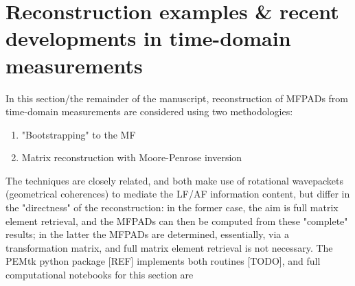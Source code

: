 \section{Reconstruction examples & recent developments in time-domain measurements}

In this section/the remainder of the manuscript, reconstruction of MFPADs from time-domain measurements are considered using two methodologies:

\begin{enumerate}
\item "Bootstrapping" to the MF \cite{hockett2018QMP1,hockett2018QMP2,marceau2017MolecularFrameReconstruction}
\item Matrix reconstruction with Moore-Penrose inversion \cite{gregory2021MolecularFramePhotoelectron}
\end{enumerate}

The techniques are closely related, and both make use of rotational wavepackets (geometrical coherences) to mediate the LF/AF information content, but differ in the "directness" of the reconstruction: in the former case, the aim is full matrix element retrieval, and the MFPADs can then be computed from these "complete" results; in the latter the MFPADs are determined, essentially, via a transformation matrix, and full matrix element retrieval is not necessary. The PEMtk python package [REF] implements both routines [TODO], and full computational notebooks for this section are 